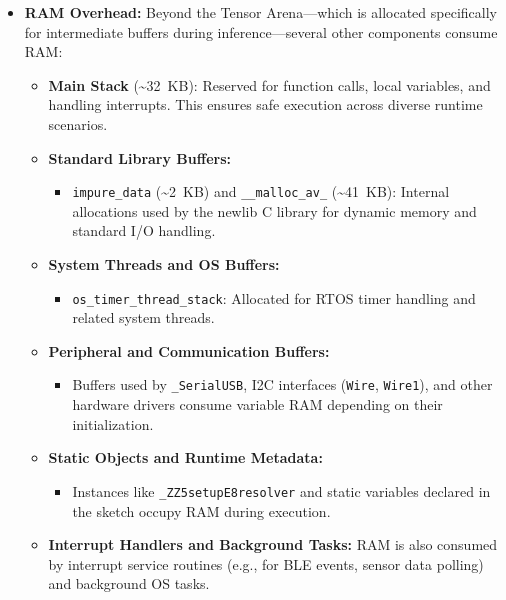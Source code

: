\newpage


\begin{itemize}
    \item \textbf{RAM Overhead:} Beyond the Tensor Arena—which is allocated specifically for intermediate buffers during inference—several other components consume RAM:
    \begin{itemize}
        \item \textbf{Main Stack} (\textasciitilde32~KB): Reserved for function calls, local variables, and handling interrupts. This ensures safe execution across diverse runtime scenarios.
        \item \textbf{Standard Library Buffers:}
        \begin{itemize}
            \item \texttt{impure\_data} (\textasciitilde2~KB) and \texttt{\_\_malloc\_av\_} (\textasciitilde41~KB): Internal allocations used by the newlib C library for dynamic memory and standard I/O handling.
        \end{itemize}
        \item \textbf{System Threads and OS Buffers:}
        \begin{itemize}
            \item \texttt{os\_timer\_thread\_stack}: Allocated for RTOS timer handling and related system threads.
        \end{itemize}
        \item \textbf{Peripheral and Communication Buffers:}
        \begin{itemize}
            \item Buffers used by \texttt{\_SerialUSB}, I2C interfaces (\texttt{Wire}, \texttt{Wire1}), and other hardware drivers consume variable RAM depending on their initialization.
        \end{itemize}
        \item \textbf{Static Objects and Runtime Metadata:}
        \begin{itemize}
            \item Instances like \texttt{\_ZZ5setupE8resolver} and static variables declared in the sketch occupy RAM during execution.
        \end{itemize}
        \item \textbf{Interrupt Handlers and Background Tasks:} RAM is also consumed by interrupt service routines (e.g., for BLE events, sensor data polling) and background OS tasks.
    \end{itemize}
\end{itemize}


